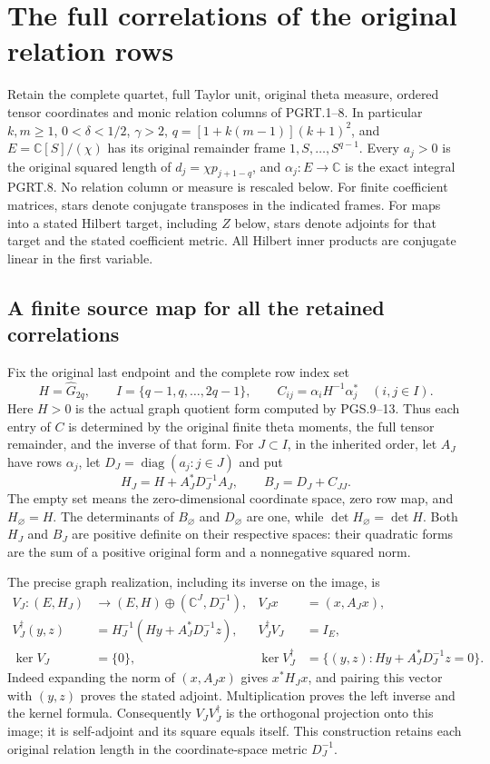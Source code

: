 \section{The full correlations of the original relation rows}
\label{sec:pgrc}

Retain the complete quartet, full Taylor unit, original theta measure,
ordered tensor coordinates and monic relation columns of PGRT.1--8.
In particular $k,m\geq1$, $0<\delta<1/2$, $\gamma>2$,
$q=[1+k(m-1)](k+1)^2$, and $E=\mathbb{C}[S]/(\chi)$ has its
original remainder frame $1,S,\ldots,S^{q-1}$. Every $a_j>0$ is
the original squared length of $d_j=\chi p_{j+1-q}$, and
$\alpha_j:E\to\mathbb{C}$ is the exact integral PGRT.8. No relation
column or measure is rescaled below. For finite coefficient matrices,
stars denote conjugate transposes in the indicated frames. For maps
into a stated Hilbert target, including $Z$ below, stars denote
adjoints for that target and the stated coefficient metric. All
Hilbert inner products are conjugate linear in the first variable.

\subsection{A finite source map for all the retained correlations}

Fix the original last endpoint and the complete row index set
\[
 H=\widehat G_{2q},\qquad I=\{q-1,q,\ldots,2q-1\},\qquad
 C_{ij}=\alpha_iH^{-1}\alpha_j^*\quad(i,j\in I).
 \tag{PGRC.1}\label{eq:pgrc-original-gram}
\]
Here $H>0$ is the actual graph quotient form computed by PGS.9--13.
Thus each entry of $C$ is determined by the original finite theta
moments, the full tensor remainder, and the inverse of that form.
For $J\subset I$, in the inherited order, let $A_J$ have rows
$\alpha_j$, let $D_J=\operatorname{diag}(a_j:j\in J)$ and put
\[
 H_J=H+A_J^*D_J^{-1}A_J,
 \qquad B_J=D_J+C_{JJ}.
 \tag{PGRC.2}\label{eq:pgrc-subset-forms}
\]
The empty set means the zero-dimensional coordinate space, zero
row map, and $H_\varnothing=H$. The determinants of
$B_\varnothing$ and $D_\varnothing$ are one, while
$\det H_\varnothing=\det H$. Both
$H_J$ and $B_J$ are positive definite on their respective spaces:
their quadratic forms are the sum of a positive original form
and a nonnegative squared norm.

The precise graph realization, including its inverse on the image,
is
\[
 \begin{aligned}
 V_J:(E,H_J)&\longrightarrow(E,H)\oplus(\mathbb{C}^J,D_J^{-1}),
 &V_Jx&=(x,A_Jx),\\
 V_J^\dagger(y,z)&=H_J^{-1}(Hy+A_J^*D_J^{-1}z),
 &V_J^\dagger V_J&=I_E,\\
 \ker V_J&=\{0\},
 &\ker V_J^\dagger&=\{(y,z):Hy+A_J^*D_J^{-1}z=0\}.
 \end{aligned}
 \tag{PGRC.3}\label{eq:pgrc-source-map}
\]
Indeed expanding the norm of $(x,A_Jx)$ gives $x^*H_Jx$,
and pairing this vector with $(y,z)$ proves the stated adjoint.
Multiplication proves the left inverse and the kernel formula.
Consequently $V_JV_J^\dagger$ is the orthogonal projection onto
this image; it is self-adjoint and its square equals itself.
This construction retains each original relation length in the
coordinate-space metric $D_J^{-1}$.


